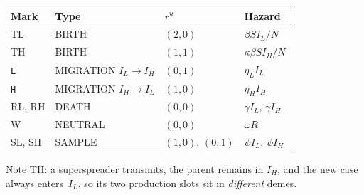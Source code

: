 \documentclass[11pt,leqno]{article}
\newcommand{\code}[1]{\texttt{#1}}
\theoremstyle{plain}
\theoremstyle{definition}
\begin{document}
\begin{center}
\renewcommand{\arraystretch}{1.15}
\begin{tabular}{llll}
\toprule
\textbf{Mark} & \textbf{Type} & \textbf{$r^u$} & \textbf{Hazard} \\
\midrule
TL          & BIRTH     & $(2,0)$ & $\beta S I_L / N$ \\
TH          & BIRTH     & $(1,1)$ & $\kappa \beta S I_H / N$ \\
\code{L}    & MIGRATION $I_L \to I_H$ & $(0,1)$ & $\eta_L I_L$ \\
\code{H}    & MIGRATION $I_H \to I_L$ & $(1,0)$ & $\eta_H I_H$ \\
RL, RH      & DEATH     & $(0,0)$ & $\gamma I_L$, $\gamma I_H$ \\
W           & NEUTRAL   & $(0,0)$ & $\omega R$ \\
SL, SH      & SAMPLE    & $(1,0)$, $(0,1)$ & $\psi I_L$, $\psi I_H$ \\
\bottomrule
\end{tabular}
\end{center}

\noindent
Note TH: a superspreader transmits, the parent remains in $I_H$, and the new
case always enters~$I_L$, so its two production slots sit in
\emph{different} demes.
\end{document}
